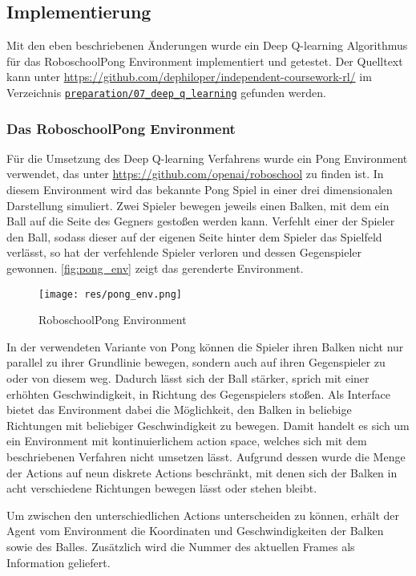 \documentclass[11pt]{scrartcl}
\begin{document}
\subsection{Implementierung}
Mit den eben beschriebenen Änderungen wurde ein Deep Q-learning Algorithmus für das
RoboschoolPong Environment implementiert und getestet. Der Quelltext kann unter
\url{https://github.com/dephiloper/independent-coursework-rl/} im Verzeichnis
\href{https://github.com/dephiloper/independent-coursework-rl/tree/master/preparation/07_deep_q_learning}
{\nolinkurl{preparation/07\_deep\_q\_learning}} gefunden werden.


\subsubsection{Das RoboschoolPong Environment}
Für die Umsetzung des Deep Q-learning Verfahrens wurde ein Pong Environment verwendet, das
unter \url{https://github.com/openai/roboschool} zu finden ist. In diesem Environment wird
das bekannte Pong Spiel in einer drei dimensionalen Darstellung simuliert. Zwei Spieler
bewegen jeweils einen Balken, mit dem ein Ball auf die Seite des Gegners gestoßen werden
kann. Verfehlt einer der Spieler den Ball, sodass dieser auf der eigenen Seite hinter dem
Spieler das Spielfeld verlässt, so hat der verfehlende Spieler verloren und dessen
Gegenspieler gewonnen. \autoref{fig:pong_env} zeigt das gerenderte Environment.

\begin{figure}[htp]
\centering
\texttt{[image: res/pong\_env.png]}
\caption{RoboschoolPong Environment}
\label{fig:pong_env}
\end{figure}
\noindent
In der verwendeten Variante von Pong können die Spieler ihren Balken nicht nur parallel zu
ihrer Grundlinie bewegen, sondern auch auf ihren Gegenspieler zu oder von diesem weg.
Dadurch lässt sich der Ball stärker, sprich mit einer erhöhten Geschwindigkeit, in Richtung
des Gegenspielers stoßen. Als Interface bietet das Environment dabei die Möglichkeit, den
Balken in beliebige Richtungen mit beliebiger Geschwindigkeit zu bewegen. Damit handelt es
sich um ein Environment mit kontinuierlichem action space, welches sich mit dem
beschriebenen Verfahren nicht umsetzen lässt. Aufgrund dessen wurde die Menge der Actions auf
neun diskrete Actions beschränkt, mit denen sich der Balken in acht verschiedene Richtungen
bewegen lässt oder stehen bleibt.

Um zwischen den unterschiedlichen Actions unterscheiden zu können, erhält der Agent vom
Environment die Koordinaten und Geschwindigkeiten der Balken sowie des Balles. Zusätzlich
wird die Nummer des aktuellen Frames als Information geliefert.
\end{document}

